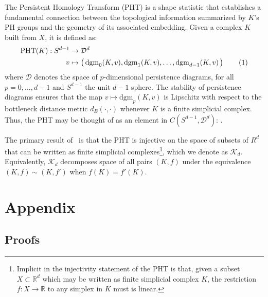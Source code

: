 \documentclass[10pt]{article}
\newcommand{\+}{%
	\raisebox{0.18ex}{\scaleobj{0.55}{+}}
}
\theoremstyle{definition}
\newcommand\numberthis{\addtocounter{equation}{1}\tag{\theequation}}
\begin{document}

The Persistent Homology Transform (PHT) is a shape statistic that establishes a fundamental connection between the topological information summarized by $K$'s PH groups and the geometry of its associated embedding. Given a complex $K$ built from $X$, it is defined as: 
\begin{align*}\label{eq:pht}
	\mathrm{PHT}(K): S^{d-1} &\to \mathcal{D}^d \\
	v &\mapsto \left( \, \mathrm{dgm}_0(K, v), \mathrm{dgm}_1(K, v), \dots, \mathrm{dgm}_{d-1}(K, v) \, \right)\numberthis
\end{align*}
where $\mathcal{D}$ denotes the space of $p$-dimensional persistence diagrams, for all $p = 0, \dots, d-1$ and $S^{d-1}$ the unit $d-1$ sphere. The stability of persistence diagrams ensures that the map $v \mapsto \mathrm{dgm}_p(K, v)$ is Lipschitz with respect to the bottleneck distance metric $d_B(\cdot, \cdot)$ whenever $K$ is a finite simplicial complex. 
Thus, the PHT may be thought of as an element in $C(S^{d-1}, \mathcal{D}^d)$: . 


The primary result of~\cite{} is that the PHT is injective on the space of subsets of $R^d$ that can be written as finite simplicial complexes\footnote{Implicit in the injectivity statement of the PHT is that, given a subset $X \subset \mathbb{R}^d$ which may be written as finite simplicial complex $K$, the restriction $f: X \to \mathbb{R}$ to any simplex in $K$ must is linear.}, which we denote as $\mathcal{K}_d$. 
Equivalently, $\mathcal{K}_d$ decomposes space of all pairs $(K, f)$ under the equivalence $(K, f) \sim (K,f')$ when $f(K) = f'(K)$.

 

\appendix
\section{Appendix}

\subsection{Proofs}
\end{document}
